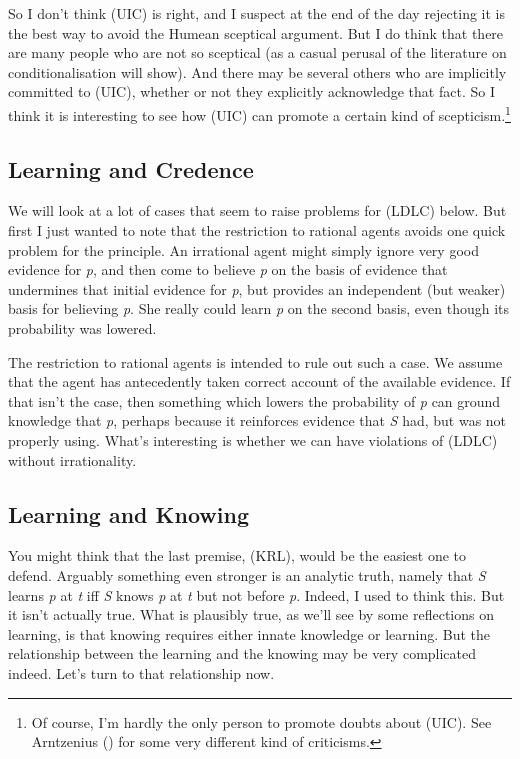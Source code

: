 \documentclass[
  10pt,
  letterpaper,
  DIV=11,
  numbers=noendperiod,
  twoside]{scrartcl}
\begin{document}
So I don't think (UIC) is right, and I suspect at the end of the day
rejecting it is the best way to avoid the Humean sceptical argument. But
I do think that there are many people who are not so sceptical (as a
casual perusal of the literature on conditionalisation will show). And
there may be several others who are implicitly committed to (UIC),
whether or not they explicitly acknowledge that fact. So I think it is
interesting to see how (UIC) can promote a certain kind of
scepticism.\footnote{Of course, I'm hardly the only person to promote
  doubts about (UIC). See Arntzenius
  () for some very different
  kind of criticisms.}

\subsection{Learning and Credence}\label{learning-and-credence}

We will look at a lot of cases that seem to raise problems for (LDLC)
below. But first I just wanted to note that the restriction to rational
agents avoids one quick problem for the principle. An irrational agent
might simply ignore very good evidence for \emph{p}, and then come to
believe \emph{p} on the basis of evidence that undermines that initial
evidence for \emph{p}, but provides an independent (but weaker) basis
for believing \emph{p}. She really could learn \emph{p} on the second
basis, even though its probability was lowered.

The restriction to rational agents is intended to rule out such a case.
We assume that the agent has antecedently taken correct account of the
available evidence. If that isn't the case, then something which lowers
the probability of \emph{p} can ground knowledge that \emph{p}, perhaps
because it reinforces evidence that \emph{S} had, but was not properly
using. What's interesting is whether we can have violations of (LDLC)
without irrationality.

\subsection{Learning and Knowing}\label{learning-and-knowing}

You might think that the last premise, (KRL), would be the easiest one
to defend. Arguably something even stronger is an analytic truth, namely
that \emph{S} learns \emph{p} at \emph{t} iff \emph{S} knows \emph{p} at
\emph{t} but not before \emph{p}. Indeed, I used to think this. But it
isn't actually true. What is plausibly true, as we'll see by some
reflections on learning, is that knowing requires either innate
knowledge or learning. But the relationship between the learning and the
knowing may be very complicated indeed. Let's turn to that relationship
now.
\end{document}
